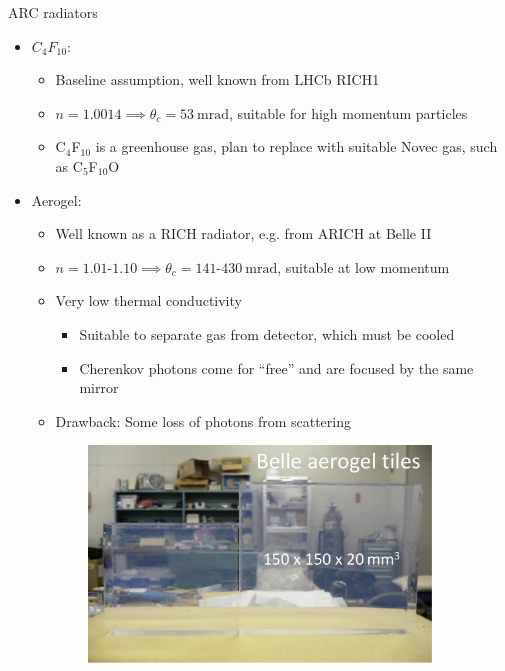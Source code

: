 \documentclass{beamer}
\begin{document}
\begin{frame}{ARC radiators}
  \begin{itemize}
    \setlength\itemsep{0.1em}
    \item{$C_4F_{10}$:}
    \begin{itemize}
      \setlength\itemsep{0.2em}
      \item{Baseline assumption, well known from LHCb RICH1}
      \item{$n = 1.0014\implies\theta_c = \SI{53}{\milli\radian}$, suitable for high momentum particles}
      \item{C$_4$F$_{10}$ is a greenhouse gas, plan to replace with suitable Novec gas, such as C$_5$F$_{10}$O}
    \end{itemize}
    \item{Aerogel:}
    \begin{itemize}
      \setlength\itemsep{0.2em}
      \item{Well known as a RICH radiator, e.g. from ARICH at Belle II}
      \item{$n = 1.01$-$1.10\implies\theta_c = 141$-$\SI{430}{\milli\radian}$, suitable at low momentum}
      \item{Very low thermal conductivity}
      \begin{itemize}
        \item{Suitable to separate gas from detector, which must be cooled}
        \item{Cherenkov photons come for ``free'' and are focused by the same mirror}
      \end{itemize}
      \item{Drawback: Some loss of photons from scattering}
    \end{itemize}
  \end{itemize}
  \begin{figure}
    \centering
    \begin{subfigure}{0.25\textwidth}
      \includegraphics[width = 1.0\textwidth]{Plots/BelleAerogelTiles.png}

\end{subfigure}
\end{figure}
\end{frame}
\end{document}
